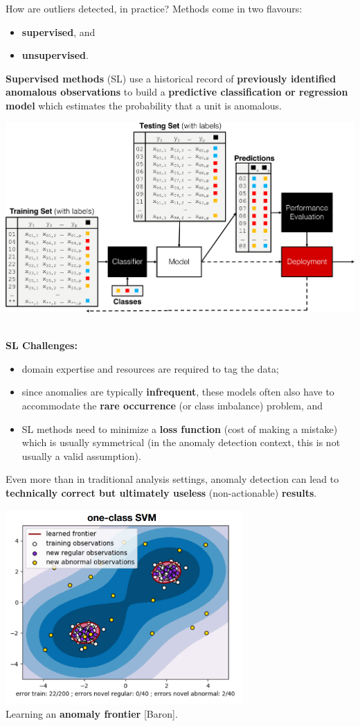\documentclass[20pt,landscape,footrule,headrule]{foils}
\newcommand{\newl}{\newline\newline}
\def\fh{\foilhead}
\begin{document}
\fh{Learning Framework} 
\noindent How are outliers detected, in practice? 
\newl Methods come in two flavours: 
\begin{itemize}
\item \textbf{supervised}, and 
\item \textbf{unsupervised}.\end{itemize}
\textbf{Supervised methods} (SL) use a historical record of \textbf{previously identified anomalous observations} to build a \textbf{predictive classification or regression model} which estimates the probability that a unit is anomalous.\newpage\ \begin{center}
\includegraphics[width=\textwidth]{Images/Classification}
\end{center}
\newpage\ \\ \noindent  \textbf{SL Challenges:} 
\begin{itemize}
\item domain expertise and resources are required to tag the data;
\item since anomalies are typically \textbf{infrequent}, these models often also have to accommodate the \textbf{rare occurrence} (or class imbalance) problem, and 
\item SL methods need to minimize a \textbf{loss function} (cost of making a mistake) which is usually symmetrical (in the anomaly detection context, this  is not usually a valid assumption). 
\end{itemize}
Even more than in traditional analysis settings, anomaly detection can lead to \textbf{technically correct but ultimately useless} (non-actionable) \textbf{results}. 
\newpage
\begin{center}
\includegraphics[width=0.68\textwidth]{Images/1SVM.png} \\ 
Learning an \textbf{anomaly frontier} [Baron].
\end{center}
\end{document}
